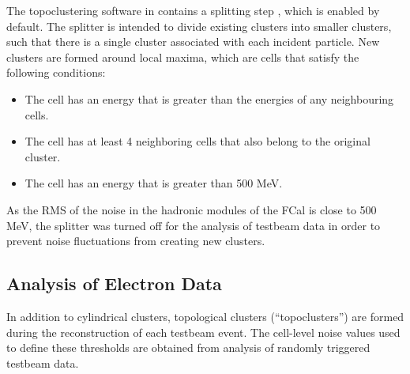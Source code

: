 The topoclustering software in \athena contains a splitting step \cite{Lampl:1099735}, which is enabled by default. The splitter is intended to divide existing clusters into smaller clusters, such that there is a single cluster associated with each incident particle. New clusters are formed around local maxima, which are cells that satisfy the following conditions:
\begin{itemize}
\item The cell has an energy that is greater than the energies of any neighbouring cells.
\item The cell has at least 4 neighboring cells that also belong to the original cluster.
\item The cell has an energy that is greater than 500 MeV.
\end{itemize}
As the RMS of the noise in the hadronic modules of the FCal is close to 500 MeV, the splitter was turned off for the analysis of testbeam data in order to prevent noise fluctuations from creating new clusters.




\subsection{Analysis of Electron Data}

 In addition to cylindrical clusters, topological clusters (``topoclusters'') are formed during the reconstruction of each testbeam event.  The cell-level noise values used to define these thresholds are obtained from analysis of randomly triggered testbeam data. 



